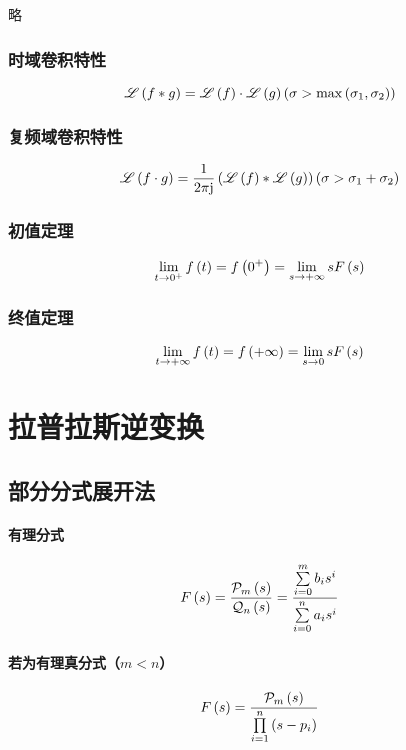 \documentclass{article}
\begin{document}
略

\subsubsection{时域卷积特性}

\[\mathscr L\left(f\ast g\right)=\mathscr L\left(f\right)\cdot\mathscr L\left(g\right)
    \left(\sigma>\max\left(\sigma_1,\sigma_2\right)\right)\]

\subsubsection{复频域卷积特性}

\[\mathscr L\left(f\cdot g\right)=
    \frac1{2\pi\mathrm j}\left(\mathscr L\left(f\right)\ast\mathscr L\left(g\right)\right)
    \left(\sigma>\sigma_1+\sigma_2\right)\]

\subsubsection{初值定理}

\[\lim_{t\to0^+}f\left(t\right)=f\left(0^+\right)=\lim_{s\to+\infty}sF\left(s\right)\]

\subsubsection{终值定理}

\[\lim_{t\to+\infty}f\left(t\right)=f\left(+\infty\right)=\lim_{s\to0}sF\left(s\right)\]

\section{拉普拉斯逆变换}

\subsection{部分分式展开法\label{部分分式展开法}}

\paragraph{有理分式}

\[F\left(s\right)=\frac{\mathcal P_m\left(s\right)}{\mathcal Q_n\left(s\right)}
    =\frac{\sum\limits_{i=0}^mb_is^i}{\sum\limits_{i=0}^na_is^i}\]

\paragraph{若为有理真分式（$m<n$）}

\[F\left(s\right)=\frac{\mathcal P_m\left(s\right)}{\prod\limits_{i=1}^n\left(s-p_i\right)}\]
\end{document}
